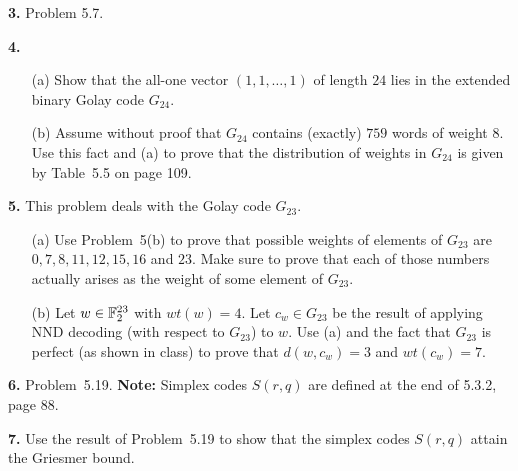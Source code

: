 \documentclass[12pt]{amsart}
\begin{document}
{\bf 3.} Problem 5.7. 
\skv

{\bf 4.}
\begin{itemize}
\item[(a)] Show that the all-one vector $(1, 1,\ldots , 1)$ of length $24$ lies in the extended binary Golay code $G_{24}$.
\item[(b)] Assume without proof that $G_{24}$ contains (exactly) $759$ words of weight $8$. Use this fact and (a) to prove that the distribution of weights in $G_{24}$ is given by Table~5.5 on page 109. 
\end{itemize}
\skv


{\bf 5.} This problem deals with the Golay code $G_{23}$.
\begin{itemize}
\item[(a)] Use Problem~5(b) to prove that possible weights of elements of $G_{23}$ are $0,7,8,11,12,15,16$ and $23$. Make sure to prove that each of those numbers actually arises as the weight of some element of $G_{23}$.
\item[(b)] Let $w\in {\mathbb F}_2^{23}$ with $wt(w)=4$. Let $c_{w}\in G_{23}$ be the result of applying NND decoding (with respect to $G_{23}$) to $w$.
Use (a) and the fact that $G_{23}$ is perfect (as shown in class) to prove that $d(w,c_w)=3$ and $wt(c_w)=7$. 
\end{itemize}
\skv

{\bf 6.} Problem~5.19. {\bf Note:} Simplex codes $S(r,q)$ are defined at the end of 5.3.2, page 88.
\skv

{\bf 7.} Use the result of Problem~5.19 to show that the simplex codes $S(r,q)$ attain the Griesmer bound.
\skv
\end{document}
